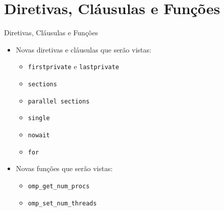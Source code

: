 \section{Diretivas, Cláusulas e Funções}

\begin{frame}{Diretivas, Cláusulas e Funções}
	\begin{itemize}
		\item Novas diretivas e cláusulas que serão vistas:
		\medskip
		\begin{itemize}
			\item \texttt{firstprivate} e \texttt{lastprivate}
			\medskip
			\item \texttt{sections}
			\medskip
			\item \texttt{parallel sections}
			\medskip
			\item \texttt{single}
			\medskip
			\item \texttt{nowait}
			\medskip
			\item \texttt{for}
		\end{itemize}
		\medskip
		\item Novas funções que serão vistas:
		\medskip
		\begin{itemize}
			\item \texttt{omp\_get\_num\_procs}
			\medskip
			\item \texttt{omp\_set\_num\_threads}
		\end{itemize}
	\end{itemize}
\end{frame}

